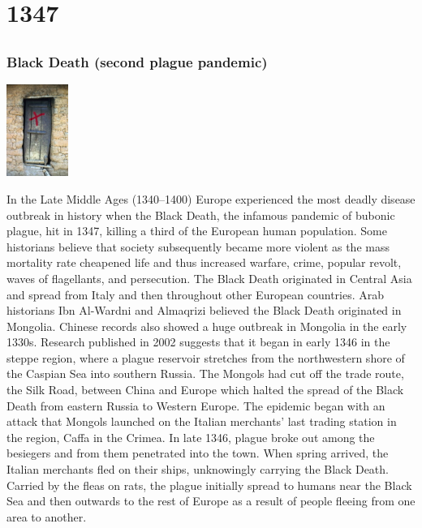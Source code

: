 \documentclass[11pt]{report}
\begin{document}
\chapter{1347}
\section{}
\subsection{Black Death (second plague pandemic)}
\vspace{2mm}\begin{center}\includegraphics[width=2cm]{./img/bubonicDoor.jpg}\end{center}
In the Late Middle Ages (1340–1400) Europe experienced the most deadly disease outbreak in history when the Black Death, the infamous pandemic of bubonic plague, hit in 1347, killing a third of the European human population. Some historians believe that society subsequently became more violent as the mass mortality rate cheapened life and thus increased warfare, crime, popular revolt, waves of flagellants, and persecution. The Black Death originated in Central Asia and spread from Italy and then throughout other European countries. Arab historians Ibn Al-Wardni and Almaqrizi believed the Black Death originated in Mongolia. Chinese records also showed a huge outbreak in Mongolia in the early 1330s. Research published in 2002 suggests that it began in early 1346 in the steppe region, where a plague reservoir stretches from the northwestern shore of the Caspian Sea into southern Russia. The Mongols had cut off the trade route, the Silk Road, between China and Europe which halted the spread of the Black Death from eastern Russia to Western Europe. The epidemic began with an attack that Mongols launched on the Italian merchants' last trading station in the region, Caffa in the Crimea. In late 1346, plague broke out among the besiegers and from them penetrated into the town. When spring arrived, the Italian merchants fled on their ships, unknowingly carrying the Black Death. Carried by the fleas on rats, the plague initially spread to humans near the Black Sea and then outwards to the rest of Europe as a result of people fleeing from one area to another.
\end{document}
